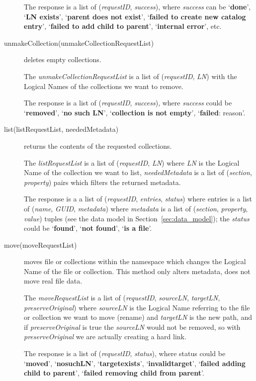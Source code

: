 \documentclass{book}
\begin{document}
\begin{description}
    The response is a list of (\emph{requestID}, \emph{success}), where \emph{success} can be `\textbf{done}', `\textbf{LN exists}', `\textbf{parent does not exist}', `\textbf{failed to create new catalog entry}', `\textbf{failed to add child to parent}', `\textbf{internal error}', etc.
    
    \item[unmakeCollection(unmakeCollectionRequestList)] deletes empty collections.

    The \emph{unmakeCollectionRequestList} is a list of (\emph{requestID}, \emph{LN}) with the Logical Names of the collections we want to remove. 

    The response is a list of (\emph{requestID}, \emph{success}), where \emph{success} could be `\textbf{removed}', `\textbf{no such LN}', `\textbf{collection is not empty}', `\textbf{failed}: reason'.
    
    \item[list(listRequestList, neededMetadata)] returns the contents of the requested collections.
        
    The \emph{listRequestList} is a list of (\emph{requestID}, \emph{LN}) where \emph{LN} is the Logical Name of the collection we want to list, \emph{neededMetadata} is a list of (\emph{section}, \emph{property}) pairs which filters the returned metadata.
    
    The response is a a list of (\emph{requestID}, \emph{entries}, \emph{status}) where entries is a list of (\emph{name}, \emph{GUID}, \emph{metadata}) where \emph{metadata} is a list of (\emph{section}, \emph{property}, \emph{value}) tuples (see the data model in Section~\ref{sec:data_model}); the \emph{status} could be `\textbf{found}', `\textbf{not found}', `\textbf{is a file}'.
    
    \item[move(moveRequestList)] moves file or collections within the namespace which changes the Logical Name of the file or collection. This method only alters metadata, does not move real file data.

    The \emph{moveRequestList} is a list of (\emph{requestID}, \emph{sourceLN}, \emph{targetLN}, \emph{preserveOriginal}) where \emph{sourceLN} is the Logical Name referring to the file or collection we want to move (rename) and \emph{targetLN} is the new path, and if \emph{preserveOriginal} is true the \emph{sourceLN} would not be removed, so with \emph{preserveOriginal} we are actually creating a hard link.
    
    The response is a list of (\emph{requestID}, \emph{status}), where status could be `\textbf{moved}', `\textbf{nosuchLN}', `\textbf{targetexists}', `\textbf{invalidtarget}', `\textbf{failed adding child to parent}', `\textbf{failed removing child from parent}'.
    

\end{description}
\end{document}
